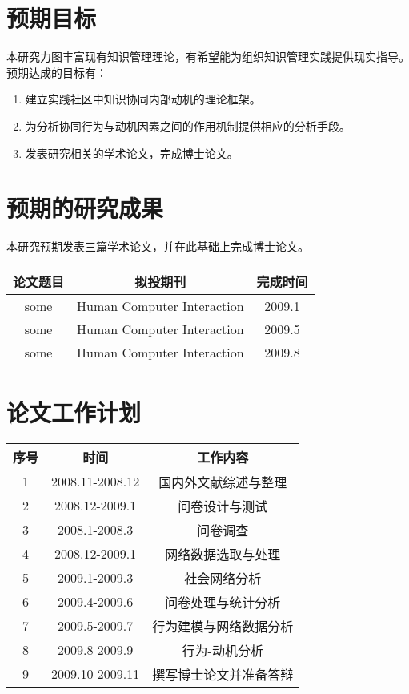\documentclass[12pt,a4paper]{ctexart}
\begin{document}
\section{预期目标}
本研究力图丰富现有知识管理理论，有希望能为组织知识管理实践提供现实指导。
预期达成的目标有：
\begin{enumerate}
\item 建立实践社区中知识协同内部动机的理论框架。
\item  为分析协同行为与动机因素之间的作用机制提供相应的分析手段。
\item  发表研究相关的学术论文，完成博士论文。
\end{enumerate}
\section{预期的研究成果}
本研究预期发表三篇学术论文，并在此基础上完成博士论文。
\\[1em]
\begin{center}
  

\begin{tabular}[center]{|c|c|c|}
\hline
论文题目&拟投期刊&完成时间\\
\hline
  some &Human Computer Interaction&2009.1\\
\hline
some&Human Computer Interaction&2009.5\\
\hline
some&Human Computer Interaction&2009.8\\
\hline
\end{tabular}
\end{center}
\section{论文工作计划}
\begin{center}
  \begin{tabular}[center]{|c|c|c|}
 \hline
序号&时间&工作内容\\
\hline
1&2008.11-2008.12&国内外文献综述与整理\\
\hline
2&2008.12-2009.1&问卷设计与测试\\
\hline
3&2008.1-2008.3&问卷调查\\
\hline
4&2008.12-2009.1&网络数据选取与处理\\
\hline
5&2009.1-2009.3&社会网络分析\\
\hline
6&2009.4-2009.6&问卷处理与统计分析\\
\hline
7&2009.5-2009.7&行为建模与网络数据分析\\
\hline
8&2009.8-2009.9&行为-动机分析\\
\hline
9&2009.10-2009.11&撰写博士论文并准备答辩\\   
\hline
  \end{tabular}
\end{center}







\end{document}
